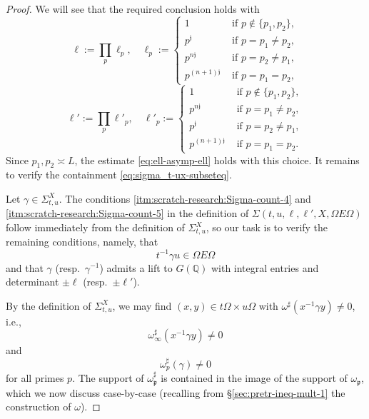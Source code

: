 \begin{proof}
  We will see that the required conclusion holds with
  \begin{equation*}
    \ell := \prod_p \ell_p, \quad
    \ell_p := \begin{cases}
      1 & \text{ if } p \notin \{p_1, p_2\}, \\
      p^{\mathfrak{j}} & \text{ if } p = p_1 \neq p_2, \\
      p^{n \mathfrak{j} } &  \text{ if } p = p_2 \neq p_1, \\
      p^{(n + 1) \mathfrak{j} } &  \text{ if } p = p_1 = p_2,
    \end{cases}
  \end{equation*}
  \begin{equation*}
    \ell ' := \prod_p \ell '_p, \quad
    \ell'_p := \begin{cases}
      1 & \text{ if } p \notin \{p_1, p_2\}, \\
      p^{n\mathfrak{j}} & \text{ if } p = p_1 \neq p_2, \\
      p^{\mathfrak{j} } &  \text{ if } p = p_2 \neq p_1, \\
      p^{(n + 1) \mathfrak{j} } &  \text{ if } p = p_1 = p_2.
    \end{cases}
  \end{equation*}
  Since $p_1, p_2 \asymp L$, the estimate \eqref{eq:ell-asymp-ell} holds with this choice.  It remains to verify the containment \eqref{eq:sigma_t-ux-subseteq}.

  Let $\gamma \in \Sigma_{t,u}^X$.  The conditions \eqref{itm:scratch-research:Sigma-count-4} and \eqref{itm:scratch-research:Sigma-count-5} in the definition of $\Sigma(t,u,\ell, \ell', X, \Omega E \Omega)$ follow immediately from the definition of $\Sigma_{t,u}^X$, so our task is to verify the remaining conditions, namely, that
  \begin{equation}\label{eq:t-1-gamma}
    t^{-1} \gamma u \in \Omega  E \Omega
  \end{equation}
  and that $\gamma$ (resp.\ $\gamma^{-1}$) admits a lift to $G(\mathbb{Q})$ with integral entries and determinant $\pm \ell$ (resp.\ $\pm \ell '$).

  By the definition of $\Sigma_{t,u}^X$, we may find $(x,y) \in t \Omega \times u \Omega$ with $\omega^\sharp(x^{-1} \gamma y) \neq 0$, i.e.,
  \begin{equation}\label{eq:omega_infty-sharp-x}
    \omega_\infty^\sharp (x^{-1} \gamma y) \neq 0
  \end{equation}
  and
  \begin{equation}\label{eq:omega_p-sharp-gamma}
    \omega_p^\sharp (\gamma ) \neq 0
  \end{equation}
  for all primes $p$.  The support of $\omega_\mathfrak{p} ^\sharp$ is contained in the image of the support of $\omega_\mathfrak{p}$, which we now discuss case-by-case (recalling from \S\ref{sec:pretr-ineq-mult-1} the construction of $\omega$).


\end{proof}

